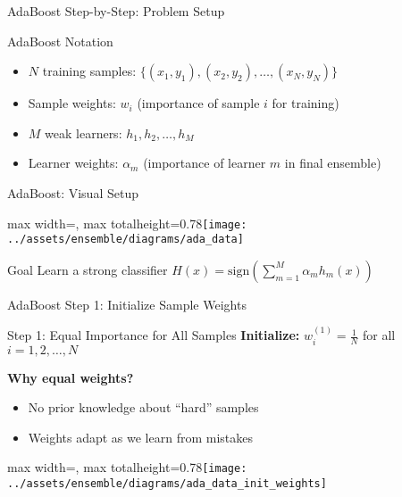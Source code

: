 \documentclass[10pt]{beamer}
\newcommand{\fitpic}[1]{\begin{adjustbox}{max width=\linewidth, max totalheight=0.78\textheight}#1\end{adjustbox}}
\begin{document}
\begin{frame}{AdaBoost Step-by-Step: Problem Setup}
\begin{definitionbox}{AdaBoost Notation}
\begin{itemize}
\item $N$ training samples: $\{(x_1, y_1), (x_2, y_2), \ldots, (x_N, y_N)\}$
\item Sample weights: $w_i$ (importance of sample $i$ for training)
\item $M$ weak learners: $h_1, h_2, \ldots, h_M$
\item Learner weights: $\alpha_m$ (importance of learner $m$ in final ensemble)
\end{itemize}
\end{definitionbox}
\end{frame}

\begin{frame}{AdaBoost: Visual Setup}
  \vspace{0.3cm}
  \centering
  \fitpic{\texttt{[image: ../assets/ensemble/diagrams/ada\_data]}}

\begin{keypointsbox}{Goal}
Learn a strong classifier $H(x) = \text{sign}\left(\sum_{m=1}^M \alpha_m h_m(x)\right)$
\end{keypointsbox}
\end{frame}

\begin{frame}{AdaBoost Step 1: Initialize Sample Weights}
\begin{alertbox}{Step 1: Equal Importance for All Samples}
\textbf{Initialize:} $w_i^{(1)} = \frac{1}{N}$ for all $i = 1, 2, \ldots, N$
\end{alertbox}

\textbf{Why equal weights?}
\begin{itemize}
\item No prior knowledge about ``hard'' samples
\item Weights adapt as we learn from mistakes
\end{itemize}

  \vspace{0.3cm}
  \centering
  \fitpic{\texttt{[image: ../assets/ensemble/diagrams/ada\_data\_init\_weights]}}
\end{frame}
\end{document}
